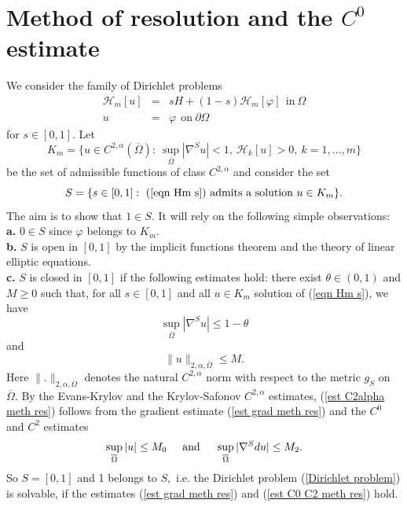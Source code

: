 \documentclass[10pt,reqno,oneside]{amsart}
\theoremstyle{definition}
\theoremstyle{remark}
\begin{document}


\section{Method of resolution and the $C^0$ estimate}\label{section method C0}
We consider the family of Dirichlet problems
\begin{eqnarray}
\mathcal{H}_m[u]&=&sH+(1-s)\mathcal{H}_m[\varphi]\ \ \mbox{in}\ \Omega\label{eqn Hm s}\\
u&=&\varphi\ \ \mbox{on}\ \partial\Omega\nonumber
\end{eqnarray}
for $s\in [0,1].$ Let
$$K_m=\{u\in C^{2,\alpha}(\overline{\Omega}):\ \sup_{\overline{\Omega}}|\nabla^Su|<1,\ \mathcal{H}_k[u]>0,\ k=1,\ldots,m\}$$
be the set of admissible functions of class $C^{2,\alpha}$ and consider the set
$$S=\{s\in[0,1]:\ (\ref{eqn Hm s})\mbox{ admits a solution } u\in K_m\}.$$
The aim is to show that $1\in S.$ It will rely on the following simple observations:
\\\textbf{a.} $0\in S$ since $\varphi$ belongs to $K_m.$
\\\textbf{b.} $S$ is open in $[0,1]$ by the implicit functions theorem and the theory of linear elliptic equations. 
\\\textbf{c.} $S$ is closed in $[0,1]$ if the following estimates hold: there exist $\theta\in(0,1)$ and $M\geq 0$ such that, for all $s\in [0,1]$ and all $u\in K_m$ solution of (\ref{eqn Hm s}), we have 
\begin{equation}\label{est grad meth res}
\sup_{\overline{\Omega}}|\nabla^Su|\leq 1-\theta
\end{equation}
and
\begin{equation}\label{est C2alpha meth res}
\|u\|_{2,\alpha,\overline{\Omega}}\leq M.
\end{equation}
Here $\|.\|_{2,\alpha,\overline{\Omega}}$ denotes the natural $C^{2,\alpha}$ norm with respect to the metric $g_S$ on $\overline{\Omega}.$ By the Evans-Krylov and the Krylov-Safonov $C^{2,\alpha}$ estimates, (\ref{est C2alpha meth res}) follows from the gradient estimate (\ref{est grad meth res}) and the $C^0$ and $C^2$ estimates
\begin{equation}\label{est C0 C2 meth res}
\sup_{\overline{\Omega}}|u|\leq M_0\hspace{.5cm}\mbox{and}\hspace{.5cm}\sup_{\overline{\Omega}}|\nabla^Sdu|\leq M_2.
\end{equation}
So $S=[0,1]$ and 1 belongs to $S,$ i.e. the Dirichlet problem (\ref{Dirichlet problem}) is solvable, if the estimates (\ref{est grad meth res}) and (\ref{est C0 C2 meth res}) hold.
\\
\end{document}
